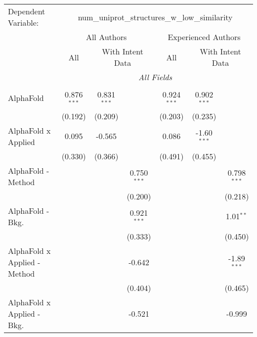 \begingroup
\centering
\begin{tabular}{lcccccc}
   \tabularnewline \midrule \midrule
   Dependent Variable: & \multicolumn{6}{c}{num\_uniprot\_structures\_w\_low\_similarity}\\
 & \multicolumn{3}{c}{All Authors} & \multicolumn{3}{c}{Experienced Authors} \\
\cmidrule(lr){2-4} \cmidrule(lr){5-7}
 & \multicolumn{1}{c}{All} & \multicolumn{2}{c}{With Intent Data} & \multicolumn{1}{c}{All} & \multicolumn{2}{c}{With Intent Data} \\
\cmidrule(lr){2-2} \cmidrule(lr){3-4} \cmidrule(lr){5-5} \cmidrule(lr){6-7}
 & \multicolumn{6}{c}{\textit{All Fields}} \\ \\
   AlphaFold                      & 0.876$^{***}$ & 0.831$^{***}$ &               & 0.924$^{***}$ & 0.902$^{***}$ &   \\   
                                  & (0.192)       & (0.209)       &               & (0.203)       & (0.235)       &   \\   
   AlphaFold x Applied            & 0.095         & -0.565        &               & 0.086         & -1.60$^{***}$ &   \\   
                                  & (0.330)       & (0.366)       &               & (0.491)       & (0.455)       &   \\   
   AlphaFold - Method             &               &               & 0.750$^{***}$ &               &               & 0.798$^{***}$\\   
                                  &               &               & (0.200)       &               &               & (0.218)\\   
   AlphaFold - Bkg.               &               &               & 0.921$^{***}$ &               &               & 1.01$^{**}$\\   
                                  &               &               & (0.333)       &               &               & (0.450)\\   
   AlphaFold x Applied - Method   &               &               & -0.642        &               &               & -1.89$^{***}$\\   
                                  &               &               & (0.404)       &               &               & (0.465)\\   
   AlphaFold x Applied - Bkg.     &               &               & -0.521        &               &               & -0.999\\   

\end{tabular}
